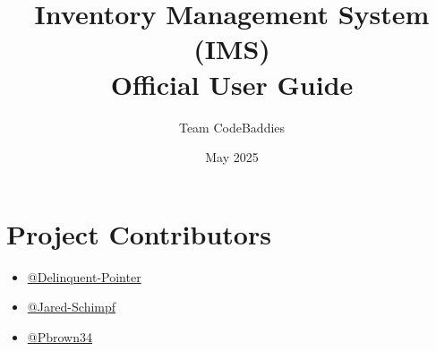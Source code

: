 \documentclass[11pt]{article}
\title{\textbf{Inventory Management System (IMS) \\ \large Official User Guide}}
\author{Team CodeBaddies}
\date{May 2025}
\begin{document}
	\maketitle
	
	\section*{Project Contributors}
	\begin{itemize}
		\item \href{https://github.com/Delinquent-Pointer}{@Delinquent-Pointer}
		\item \href{https://github.com/Jared-Schimpf}{@Jared-Schimpf}
		\item \href{https://github.com/Pbrown34}{@Pbrown34}
	\end{itemize}
	
	\tableofcontents
	\newpage
	
	
	
\end{document}
